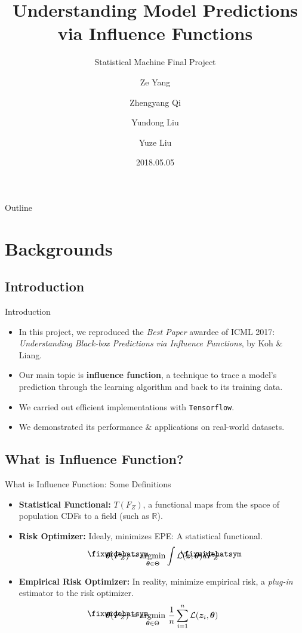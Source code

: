 \documentclass[blue]{beamer}
\title{Understanding Model Predictions via Influence Functions}
\subtitle{Statistical Machine Final Project}
\author{Ze Yang \and Zhengyang Qi \and Yundong Liu \and Yuze Liu}
\institute[Carnegie Mellon University] %
{Carnegie Mellon University}
\date{2018.05.05}
\newcommand\lowerwidehatsym{%
  \text{\smash{\raisebox{-1.3ex}{%
    $\fixwidehatsym$}}}}
\newcommand\fixwidehat[1]{%
  \mathchoice
    {\accentset{\displaystyle\lowerwidehatsym}{#1}}
    {\accentset{\textstyle\lowerwidehatsym}{#1}}
    {\accentset{\scriptstyle\lowerwidehatsym}{#1}}
    {\accentset{\scriptscriptstyle\lowerwidehatsym}{#1}}
}
\begin{document}
\begin{frame}
  \titlepage
\end{frame}

\begin{frame}{Outline}
  \tableofcontents
\end{frame}

\section{Backgrounds}

\subsection{Introduction}

\begin{frame}{Introduction}{}
    \begin{itemize}
        \item  In this project, we reproduced the \emph{Best Paper} awardee of ICML 2017: \textit{Understanding Black-box Predictions via Influence Functions}, by Koh \& Liang.
        \item Our main topic is \textbf{influence function}, a technique to trace a model’s prediction through the learning algorithm and back to its training data.
        \item  We carried out efficient implementations with \texttt{Tensorflow}.
        \item We demonstrated its performance \& applications on real-world datasets.
        
    \end{itemize}
\end{frame}

\subsection{What is Influence Function?}

\begin{frame}{What is Influence Function: Some Definitions}{}
  \begin{itemize}
  \item \textbf{Statistical Functional:} $T(F_Z)$, a functional maps from the space of population CDFs to a field (such as $\mathbb{R}$). 
  \item \textbf{Risk Optimizer:} Idealy, minimizes EPE: A statistical functional.
  $$
  \bm{\theta}(\fixwidehat{F}_Z)=\underset{\bm{\theta} \in \Theta}{\mathrm{argmin}}\int\mathcal{L}(\bm{z},\bm{\theta})d\fixwidehat{F}_Z
  $$
  \item \textbf{Empirical Risk Optimizer:} In reality, minimize empirical risk, a \textit{plug-in} estimator to the risk optimizer.
    $$
  \bm{\theta}(\fixwidehat{F}_Z)=\underset{\bm{\theta} \in \Theta}{\mathrm{argmin}}~\frac{1}{n}\sum_{i=1}^n\mathcal{L}(\bm{z}_i,\bm{\theta})
  $$
  \end{itemize}
\end{frame}
\end{document}
